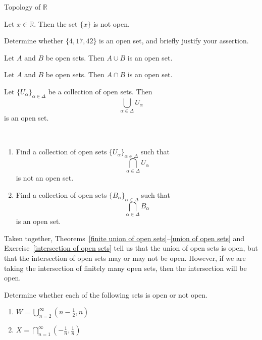 \begin{section}{Topology of $\mathbb{R}$}
\begin{theorem}
Let $x\in\mathbb{R}$.  Then the set $\{x\}$ is not open.
\end{theorem}

\begin{exercise} 
Determine whether $\{4,17,42\}$ is an open set, and briefly justify your assertion. 
\end{exercise}

\begin{theorem}\label{finite union of open sets}
Let $A$ and $B$ be open sets.  Then $A\cup B$ is an open set. 
\end{theorem}

\begin{theorem}\label{finite intersection of open sets}
Let $A$ and $B$ be open sets.  Then $A\cap B$ is an open set.
\end{theorem}

\begin{theorem}\label{union of open sets}
Let $\{U_{\alpha}\}_{\alpha\in\Delta}$ be a collection of open sets.  Then
\[
\bigcup_{\alpha\in\Delta} U_{\alpha}
\]
is an open set.
\end{theorem}

\begin{exercise}\label{intersection of open sets}\
\begin{enumerate}
\item Find a collection of open sets $\{U_{\alpha}\}_{\alpha\in\Delta}$ such that
\[
\bigcap_{\alpha\in\Delta} U_{\alpha}
\]
is not an open set.
\item Find a collection of open sets $\{B_{\alpha}\}_{\alpha\in\Delta}$ such that
\[
\bigcap_{\alpha\in\Delta} B_{\alpha}
\]
is an open set.
\end{enumerate}
\end{exercise}

\begin{remark}\label{union vs intersection of open sets}
Taken together, Theorems~\ref{finite union of open sets}--\ref{union of open sets} and Exercise~\ref{intersection of open sets} tell us that the union of open sets is open, but that the intersection of open sets may or may not be open.  However, if we are taking the intersection of finitely many open sets, then the intersection will be open.
\end{remark}

\begin{exercise}
Determine whether each of the following sets is open or not open.
\begin{enumerate}
\item $\displaystyle W=\bigcup_{n=2}^{\infty} \left(n - \frac{1}{2},n\right)$
\item $\displaystyle X=\bigcap_{n=1}^{\infty} \left(-\frac{1}{n}, \frac{1}{n}\right)$
\end{enumerate}
\end{exercise}


\end{section}

